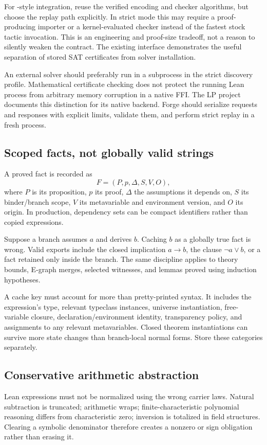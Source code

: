 \documentclass[11pt,letterpaper]{article}
\newcommand{\code}[1]{\texttt{\detokenize{#1}}}
\theoremstyle{definition}\newtheorem{definition}[proposition]{Definition}
\begin{document}
For \code{bv_decide}-style integration, reuse the verified encoding and checker algorithms, but choose the replay path explicitly. In strict mode this may require a proof-producing importer or a kernel-evaluated checker instead of the fastest stock tactic invocation. This is an engineering and proof-size tradeoff, not a reason to silently weaken the contract. The existing \code{bv_check} interface demonstrates the useful separation of stored SAT certificates from solver installation.~\cite{bvapi}

An external solver should preferably run in a subprocess in the strict discovery profile. Mathematical certificate checking does not protect the running Lean process from arbitrary memory corruption in a native FFI. The LP project documents this distinction for its native backend. Forge should serialize requests and responses with explicit limits, validate them, and perform strict replay in a fresh process.~\cite{lp}

\subsection{Scoped facts, not globally valid strings}
A proved fact is recorded as
\[
F=(P,p,\Delta,S,V,O),
\]
where $P$ is its proposition, $p$ its proof, $\Delta$ the assumptions it depends on, $S$ its binder/branch scope, $V$ its metavariable and environment version, and $O$ its origin. In production, dependency sets can be compact identifiers rather than copied expressions.

Suppose a branch assumes $a$ and derives $b$. Caching $b$ as a globally true fact is wrong. Valid exports include the closed implication $a\to b$, the clause $\neg a\lor b$, or a fact retained only inside the branch. The same discipline applies to theory bounds, E-graph merges, selected witnesses, and lemmas proved using induction hypotheses.

A cache key must account for more than pretty-printed syntax. It includes the expression's type, relevant typeclass instances, universe instantiation, free-variable closure, declaration/environment identity, transparency policy, and assignments to any relevant metavariables. Closed theorem instantiations can survive more state changes than branch-local normal forms. Store these categories separately.

\subsection{Conservative arithmetic abstraction}
Lean expressions must not be normalized using the wrong carrier laws. Natural subtraction is truncated; \code{BitVec} arithmetic wraps; finite-characteristic polynomial reasoning differs from characteristic zero; inversion is totalized in field structures. Clearing a symbolic denominator therefore creates a nonzero or sign obligation rather than erasing it.
\end{document}

